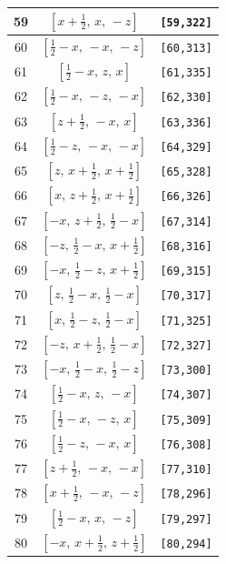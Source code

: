 \documentclass[fleqn,8pt]{jsarticle}
\begin{document}
\begin{longtable}{ccc}
59 & $\left[ x + \frac{1}{2},\, x,\, - z \right]$ & {\tt [59,322]} \\ \hline
60 & $\left[ \frac{1}{2} - x,\, - x,\, - z \right]$ & {\tt [60,313]} \\ \hline
61 & $\left[ \frac{1}{2} - x,\, z,\, x \right]$ & {\tt [61,335]} \\ \hline
62 & $\left[ \frac{1}{2} - x,\, - z,\, - x \right]$ & {\tt [62,330]} \\ \hline
63 & $\left[ z + \frac{1}{2},\, - x,\, x \right]$ & {\tt [63,336]} \\ \hline
64 & $\left[ \frac{1}{2} - z,\, - x,\, - x \right]$ & {\tt [64,329]} \\ \hline
65 & $\left[ z,\, x + \frac{1}{2},\, x + \frac{1}{2} \right]$ & {\tt [65,328]} \\ \hline
66 & $\left[ x,\, z + \frac{1}{2},\, x + \frac{1}{2} \right]$ & {\tt [66,326]} \\ \hline
67 & $\left[ - x,\, z + \frac{1}{2},\, \frac{1}{2} - x \right]$ & {\tt [67,314]} \\ \hline
68 & $\left[ - z,\, \frac{1}{2} - x,\, x + \frac{1}{2} \right]$ & {\tt [68,316]} \\ \hline
69 & $\left[ - x,\, \frac{1}{2} - z,\, x + \frac{1}{2} \right]$ & {\tt [69,315]} \\ \hline
70 & $\left[ z,\, \frac{1}{2} - x,\, \frac{1}{2} - x \right]$ & {\tt [70,317]} \\ \hline
71 & $\left[ x,\, \frac{1}{2} - z,\, \frac{1}{2} - x \right]$ & {\tt [71,325]} \\ \hline
72 & $\left[ - z,\, x + \frac{1}{2},\, \frac{1}{2} - x \right]$ & {\tt [72,327]} \\ \hline
73 & $\left[ - x,\, \frac{1}{2} - x,\, \frac{1}{2} - z \right]$ & {\tt [73,300]} \\ \hline
74 & $\left[ \frac{1}{2} - x,\, z,\, - x \right]$ & {\tt [74,307]} \\ \hline
75 & $\left[ \frac{1}{2} - x,\, - z,\, x \right]$ & {\tt [75,309]} \\ \hline
76 & $\left[ \frac{1}{2} - z,\, - x,\, x \right]$ & {\tt [76,308]} \\ \hline
77 & $\left[ z + \frac{1}{2},\, - x,\, - x \right]$ & {\tt [77,310]} \\ \hline
78 & $\left[ x + \frac{1}{2},\, - x,\, - z \right]$ & {\tt [78,296]} \\ \hline
79 & $\left[ \frac{1}{2} - x,\, x,\, - z \right]$ & {\tt [79,297]} \\ \hline
80 & $\left[ - x,\, x + \frac{1}{2},\, z + \frac{1}{2} \right]$ & {\tt [80,294]} \\ \hline

\end{longtable}
\end{document}

